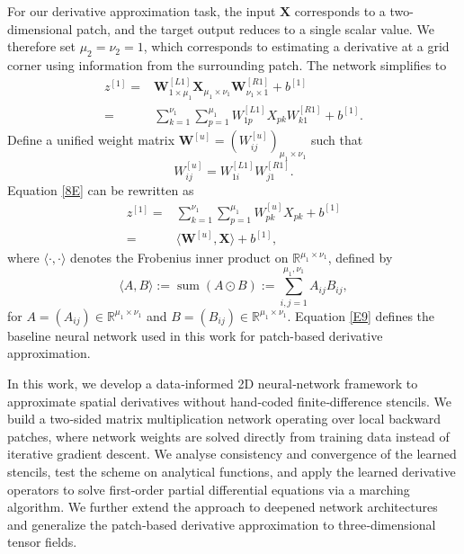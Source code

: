 \documentclass[pdflatex,sn-mathphys-num]{sn-jnl}%
\theoremstyle{thmstyleone}%
\theoremstyle{thmstyletwo}%
\theoremstyle{thmstylethree}%
\begin{document}
For our derivative approximation task, the input $\boldsymbol{X}$ corresponds to a two-dimensional patch, and the target output reduces to a single scalar value. We therefore set $\mu_2=\nu_2=1$, which corresponds to estimating a derivative at a grid corner using information from the surrounding patch. The network simplifies to
\begin{equation}\label{8E}
\begin{split}
z^{[1]}
=&
\boldsymbol{W}^{[L1]}_{1 \times \mu_1}
\boldsymbol{X}_{\mu_1 \times \nu_1}
\boldsymbol{W}^{[R1]}_{\nu_1 \times 1}
+ b^{[1]}\\
=&\sum_{k=1}^{\nu_1}\sum_{p=1}^{\mu_1} W^{[L1]}_{1p}X_{pk}W^{[R1]}_{k1}+ b^{[1]}.
\end{split}
\end{equation}
Define a unified weight matrix $\boldsymbol{W}^{[u]}=(W^{[u]}_{ij})_{\mu_1\times\nu_1}$ such that
$$W^{[u]}_{ij}=W^{[L1]}_{1i}W^{[R1]}_{j1}.$$
Equation \eqref{8E} can be rewritten as
\begin{equation}\label{E9}
\begin{split}
z^{[1]}
=&\sum_{k=1}^{\nu_1}\sum_{p=1}^{\mu_1} W^{[u]}_{pk}X_{pk}+ b^{[1]}
\\
=&\langle\boldsymbol{W}^{[u]}, \boldsymbol{X}\rangle + b^{[1]},
\end{split}
\end{equation}
where $\langle\cdot,\cdot\rangle$ denotes the Frobenius inner product on $\mathbb{R}^{\mu_1\times \nu_1}$, defined by
\[
\langle A,B\rangle:=\operatorname{sum}(A\odot B):=\sum_{i,j=1}^{\mu_1,\nu_1}A_{ij}B_{ij},
\]
for $A=(A_{ij})\in\mathbb{R}^{\mu_1\times \nu_1}$ and $B=(B_{ij})\in \mathbb{R}^{\mu_1\times \nu_1}$.
Equation \eqref{E9} defines the baseline neural network used in this work for patch-based derivative approximation.

In this work, we develop a data‑informed 2D neural‑network framework to approximate spatial derivatives without hand‑coded finite‑difference stencils. We build a two‑sided matrix multiplication network operating over local backward patches, where network weights are solved directly from training data instead of iterative gradient descent. We analyse consistency and convergence of the learned stencils, test the scheme on analytical functions, and apply the learned derivative operators to solve first‑order partial differential equations via a marching algorithm. We further extend the approach to deepened network architectures and generalize the patch‑based derivative approximation to three‑dimensional tensor fields.
\end{document}
